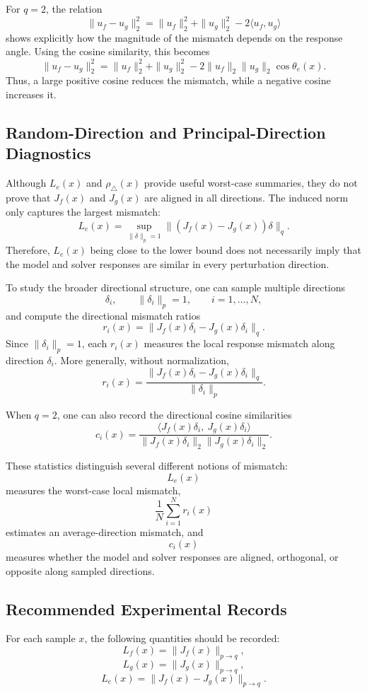 \documentclass{article}
\begin{document}
For \(q=2\), the relation
\[
\|u_f-u_g\|_2^2
=
\|u_f\|_2^2+\|u_g\|_2^2
-
2\langle u_f,u_g\rangle
\]
shows explicitly how the magnitude of the mismatch depends on the response angle. Using the cosine similarity, this becomes
\[
\|u_f-u_g\|_2^2
=
\|u_f\|_2^2+\|u_g\|_2^2
-
2\|u_f\|_2\|u_g\|_2\cos\theta_e(x).
\]
Thus, a large positive cosine reduces the mismatch, while a negative cosine increases it.

\subsection{Random-Direction and Principal-Direction Diagnostics}

Although \(L_e(x)\) and \(\rho_{\triangle}(x)\) provide useful worst-case summaries, they do not prove that \(J_f(x)\) and \(J_g(x)\) are aligned in all directions. The induced norm only captures the largest mismatch:
\[
L_e(x)
=
\sup_{\|\delta\|_p=1}
\|(J_f(x)-J_g(x))\delta\|_q.
\]
Therefore, \(L_e(x)\) being close to the lower bound does not necessarily imply that the model and solver responses are similar in every perturbation direction.

To study the broader directional structure, one can sample multiple directions
\[
\delta_i,
\qquad
\|\delta_i\|_p=1,
\qquad
i=1,\dots,N,
\]
and compute the directional mismatch ratios
\[
r_i(x)
=
\|J_f(x)\delta_i-J_g(x)\delta_i\|_q.
\]
Since \(\|\delta_i\|_p=1\), each \(r_i(x)\) measures the local response mismatch along direction \(\delta_i\). More generally, without normalization,
\[
r_i(x)
=
\frac{
\|J_f(x)\delta_i-J_g(x)\delta_i\|_q
}{
\|\delta_i\|_p
}.
\]

When \(q=2\), one can also record the directional cosine similarities
\[
c_i(x)
=
\frac{
\langle J_f(x)\delta_i,\ J_g(x)\delta_i\rangle
}{
\|J_f(x)\delta_i\|_2
\|J_g(x)\delta_i\|_2
}.
\]

These statistics distinguish several different notions of mismatch:
\[
L_e(x)
\]
measures the worst-case local mismatch,
\[
\frac{1}{N}\sum_{i=1}^N r_i(x)
\]
estimates an average-direction mismatch, and
\[
c_i(x)
\]
measures whether the model and solver responses are aligned, orthogonal, or opposite along sampled directions.

\subsection{Recommended Experimental Records}

For each sample \(x\), the following quantities should be recorded:
\[
L_f(x)=\|J_f(x)\|_{p\to q},
\]
\[
L_g(x)=\|J_g(x)\|_{p\to q},
\]
\[
L_e(x)=\|J_f(x)-J_g(x)\|_{p\to q}.
\]
\end{document}
